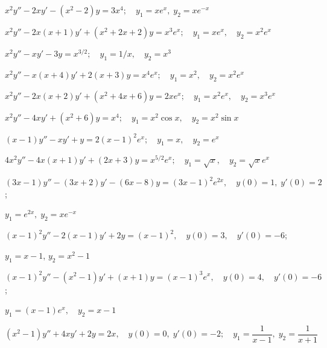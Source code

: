 \begin{exerciselist}
\item\label{exer:5.7.22}$x^2y''-2xy'-(x^2-2)y=3x^4;\quad  y_1=xe^x,\;  y_2=xe^{-x}$

\item\label{exer:5.7.23}$x^2y''-2x(x+1)y' +(x^2+2x+2)y=x^3e^x;   \quad y_1=xe^x, \quad y_2=x^2e^x$

\item\label{exer:5.7.24}$x^2y''-xy'-3y=x^{3/2};  \quad y_1=1/x, \quad y_2=x^3$

\item\label{exer:5.7.25}$x^2y''-x(x+4)y'+2(x+3)y=x^4e^x;  \quad y_1=x^2, \quad y_2=x^2e^x$

\item\label{exer:5.7.26}$x^2y''-2x(x+2)y'+(x^2+4x+6)y=2xe^x;  \quad y_1=x^2e^x, \quad y_2=x^3e^x$

\item\label{exer:5.7.27}$x^2y''-4xy'+(x^2+6)y=x^4;  \quad y_1=x^2\cos x, \quad y_2=x^2\sin x$

\item\label{exer:5.7.28}$(x-1)y''-xy'+y=2(x-1)^2e^x;  \quad y_1=x, \quad y_2=e^x$

\item\label{exer:5.7.29}$4x^2y''-4x(x+1)y'+(2x+3)y=x^{5/2}e^x;   \quad
y_1=\sqrt x, \quad y_2=\sqrt xe^x$



\item\label{exer:5.7.30}$(3x-1)y''-(3x+2)y'-(6x-8)y=(3x-1)^2e^{2x}, \quad   y(0)=1,\;
y'(0)=2$;

$y_1=e^{2x},\;  y_2=xe^{-x}$

\item\label{exer:5.7.31}$(x-1)^2y''-2(x-1)y'+2y=(x-1)^2, \quad   y(0)=3,\quad   y'(0)=-6$;

$y_1=x-1$,\;
$y_2=x^2-1$

\item\label{exer:5.7.32}$(x-1)^2y''-(x^2-1)y'+(x+1)y=(x-1)^3e^x, \quad  y(0)=4,\quad y'(0)=-6$;

$y_1=(x-1)e^x,\quad y_2=x-1$




\item\label{exer:5.7.33}\CGex
$(x^2-1)y''+4xy'+2y=2x, \quad   y(0)=0,\;  y'(0)
=-2; \quad   y_1=\dfrac{1}{x-1},\;  y_2=\dfrac{1}{x+1}$


\end{exerciselist}
